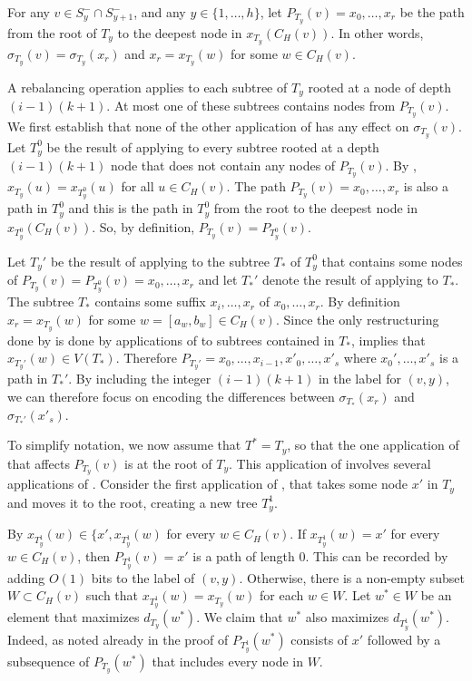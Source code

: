 \documentclass[kpfonts]{patmorin}
\begin{document}
For any $v\in S^-_{y}\cap S^-_{y+1}$, and any $y\in\{1,\ldots,h\}$, let $P_{T_y}(v)=x_0,\ldots,x_r$ be the path from the root of $T_y$ to the deepest node in $x_{T_y}(C_H(v))$.  In other words, $\sigma_{T_y}(v)=\sigma_{T_y}(x_r)$ and $x_r=x_{T_y}(w)$ for some $w\in C_H(v)$.

A rebalancing operation applies  to each subtree of $T_y$ rooted at a node of depth $(i-1)(k+1)$.  At most one of these subtrees contains nodes from $P_{T_y}(v)$. We first establish that none of the other application of  has any effect on $\sigma_{T_y}(v)$.  Let $T_y^0$ be the result of applying  to every subtree rooted at a depth $(i-1)(k+1)$ node that does not contain any nodes of $P_{T_y}(v)$.
By , $x_{T_y}(u)=x_{T_y^0}(u)$ for all $u\in C_H(v)$.  The path $P_{T_y}(v)=x_0,\ldots,x_r$ is also a path in $T_y^0$ and this is the path in $T_y^0$ from the root to the deepest node in $x_{T_y^0}(C_H(v))$. So, by definition, $P_{T_y}(v)=P_{T_y^0}(v)$.

Let $T_y'$ be the result of applying  to the subtree $T_*$ of $T_y^0$ that contains some nodes of $P_{T_y}(v)=P_{T_y^0}(v)=x_0,\ldots,x_r$ and let $T_*'$ denote the result of applying  to $T_*$.
The subtree $T_*$ contains some suffix $x_i,\ldots,x_r$ of $x_0,\ldots,x_r$.  By definition $x_r=x_{T_y}(w)$ for some $w=[a_w,b_w]\in C_H(v)$.  Since the only restructuring done by  is done by applications of  to subtrees contained in $T_*$,   implies that $x_{T_y'}(w)\in V(T_*)$.  Therefore $P_{T_y'}=x_0,\ldots,x_{i-1},x'_0,\ldots,x'_{s}$ where $x_0',\ldots,x'_s$ is a path in $T_*'$. By including the integer $(i-1)(k+1)$ in the label for $(v,y)$, we can therefore focus on encoding the differences between $\sigma_{T_*}(x_r)$ and $\sigma_{T_*'}(x'_s)$.

To simplify notation, we now assume that $T^*=T_y$, so that the one application of  that affects $P_{T_y}(v)$ is at the root of $T_y$.
This application of  involves several applications of .  Consider the first application of , that takes some node $x'$ in $T_y$ and moves it to the root, creating a new tree $T_y^1$.

By  $x_{T_y^1}(w)\in\{x',x_{T_y^1}(w)$ for every $w\in C_H(v)$.  If $x_{T_y^1}(w)=x'$ for every $w\in C_H(v)$, then $P_{T_y^1}(v)=x'$ is a path of length 0.  This can be recorded by adding $O(1)$ bits to the label of $(v,y)$. Otherwise, there is a non-empty subset $W\subset C_H(v)$ such that $x_{T_y^1}(w)=x_{T_y}(w)$ for each $w\in W$.  Let $w^*\in W$ be an element that maximizes $d_{T_y}(w^*)$.  We claim that $w^*$ also maximizes $d_{T_y^1}(w^*)$.  Indeed, as noted already in the proof of  $P_{T_y^1}(w^*)$ consists of $x'$ followed by a subsequence of $P_{T_y}(w^*)$ that includes every node in $W$.
\end{document}
